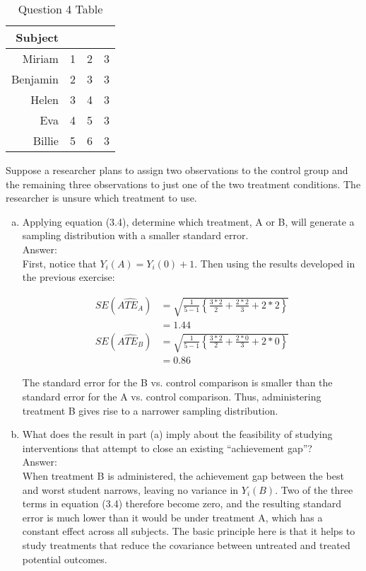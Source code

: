 \documentclass[11pt,notitlepage]{article}\usepackage[]{graphicx}\usepackage[]{color}
\begin{document}
\begin{table}[htbp]
  \centering
  \caption{Question 4 Table}
    \begin{tabular}{rccc}
    \toprule
    Subject &       &       &  \\
    \midrule
    Miriam & 1     & 2     & 3 \\
    Benjamin & 2     & 3     & 3 \\
    Helen & 3     & 4     & 3 \\
    Eva   & 4     & 5     & 3 \\
    Billie & 5     & 6     & 3 \\
    \bottomrule
    \end{tabular}%
  \label{tab:addlabel}%
\end{table}

Suppose a researcher plans to assign two observations to the control group and the remaining three observations to just one of the two treatment conditions.  The researcher is unsure which treatment to use.  

\begin{enumerate}[a)]
\item Applying equation (3.4), determine which treatment, A or B, will generate a sampling distribution with a smaller standard error.\\
Answer:\\
First, notice that $Y_i (A)=Y_i (0)+1$. Then using the results developed in the previous exercise:

\begin{align*}
SE(\widehat{ATE_{A}}) &= \sqrt{\frac{1}{5-1}\left \{ \frac{3*2}{2} + \frac{2*2}{3} + 2*2 \right \}} \\
&= 1.44\\
SE(\widehat{ATE_{B}}) &= \sqrt{\frac{1}{5-1}\left \{ \frac{3*2}{2} + \frac{2*0}{3} + 2*0 \right \}} \\
&= 0.86
\end{align*}

The standard error for the B vs. control comparison is smaller than the standard error for the A vs. control comparison. Thus, administering treatment B gives rise to a narrower sampling distribution.

\item What does the result in part (a) imply about the feasibility of studying interventions that attempt to close an existing ``achievement gap''?\\
Answer:\\
When treatment B is administered, the achievement gap between the best and worst student narrows, leaving no variance in $Y_i (B)$. Two of the three terms in equation (3.4) therefore become zero, and the resulting standard error is much lower than it would be under treatment A, which has a constant effect across all subjects. The basic principle here is that it helps to study treatments that reduce the covariance between untreated and treated potential outcomes. 
\end{enumerate}
\end{document}
